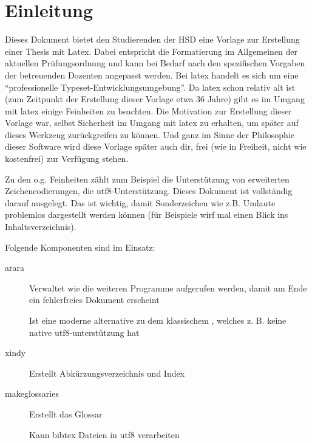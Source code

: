 
\newpage

\section{Einleitung}%
\label{sec:einl}
Dieses Dokument bietet den Studierenden der HSD eine Vorlage zur Erstellung einer Thesis mit Latex. Dabei entspricht die Formatierung im Allgemeinen der aktuellen Prüfungsordnung und kann bei Bedarf nach den spezifischen Vorgaben der betreuenden Dozenten angepasst werden. Bei \gls{latex} handelt es sich um eine \enquote{professionelle Typeset-Entwicklungsumgebung}. Da \gls{latex} schon relativ alt ist (zum Zeitpunkt der Erstellung dieser Vorlage etwa 36 Jahre) gibt es im Umgang mit \gls{latex} einige Feinheiten zu beachten. Die Motivation zur Erstellung dieser Vorlage war, selbst Sicherheit im Umgang mit \gls{latex} zu erhalten, um später auf dieses Werkzeug zurückgreifen zu können. Und ganz im Sinne der Philosophie dieser Software wird diese Vorlage später auch dir, frei (wie in Freiheit, nicht wie kostenfrei) zur Verfügung stehen.

Zu den o.g. Feinheiten zählt zum Beispiel die Unterstützung von erweiterten Zeichencodierungen, die \gls{utf8}-Unterstützung. Dieses Dokument ist vollständig darauf ausgelegt.
Das ist wichtig, damit Sonderzeichen wie z.B. Umlaute problemlos dargestellt werden können (für Beispiele wirf mal einen Blick ins Inhaltsverzeichnis).

Folgende Komponenten sind im Einsatz:
\begin{description}
  \item[arara] Verwaltet wie die weiteren Programme aufgerufen werden, damit am Ende ein fehlerfreies Dokument erscheint
  \item[\protect{}] Ist eine moderne alternative zu dem klassischem \glqq {}\grqq , welches z. B. keine native \gls{utf8}-unterstützung hat
  \item[xindy] Erstellt Abkürzungsverzeichnis und Index
  \item[makeglossaries] Erstellt das Glossar
  \item[\protect{}] Kann bibtex Dateien in \gls{utf8} verarbeiten
\end{description}

